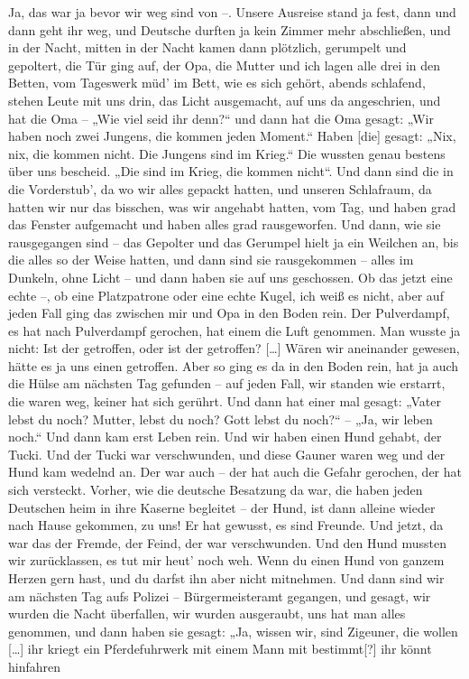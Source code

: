 \documentclass[ngerman,]{article}
\begin{document}
\begin{multicols}{2}
\begin{description}
Ja, das war ja bevor wir weg sind von –. Unsere Ausreise stand ja fest,
dann und dann geht ihr weg, und Deutsche durften ja kein Zimmer mehr
abschließen, und in der Nacht, mitten in der Nacht kamen dann plötzlich,
gerumpelt und gepoltert, die Tür ging auf, der Opa, die Mutter und ich
lagen alle drei in den Betten, vom Tageswerk müd' im Bett, wie es sich
gehört, abends schlafend, stehen Leute mit uns drin, das Licht
ausgemacht, auf uns da angeschrien, und hat die Oma – „Wie viel seid ihr
denn?“ und dann hat die Oma gesagt: „Wir haben noch zwei Jungens, die
kommen jeden Moment.“ Haben {[}die{]} gesagt: „Nix, nix, die kommen
nicht. Die Jungens sind im Krieg.“ Die wussten genau bestens über uns
bescheid. „Die sind im Krieg, die kommen nicht“. Und dann sind die in
die Vorderstub', da wo wir alles gepackt hatten, und unseren Schlafraum,
da hatten wir nur das bisschen, was wir angehabt hatten, vom Tag, und
haben grad das Fenster aufgemacht und haben alles grad rausgeworfen. Und
dann, wie sie rausgegangen sind – das Gepolter und das Gerumpel hielt ja
ein Weilchen an, bis die alles so der Weise hatten, und dann sind sie
rausgekommen – alles im Dunkeln, ohne Licht – und dann haben sie auf uns
geschossen. Ob das jetzt eine echte –, ob eine Platzpatrone oder eine
echte Kugel, ich weiß es nicht, aber auf jeden Fall ging das zwischen
mir und Opa in den Boden rein. Der Pulverdampf, es hat nach Pulverdampf
gerochen, hat einem die Luft genommen. Man wusste ja nicht: Ist der
getroffen, oder ist der getroffen? {[}\ldots{}{]} Wären wir aneinander
gewesen, hätte es ja uns einen getroffen. Aber so ging es da in den
Boden rein, hat ja auch die Hülse am nächsten Tag gefunden – auf jeden
Fall, wir standen wie erstarrt, die waren weg, keiner hat sich gerührt.
Und dann hat einer mal gesagt: „Vater lebst du noch? Mutter, lebst du
noch? Gott lebst du noch?“ – „Ja, wir leben noch.“ Und dann kam erst
Leben rein. Und wir haben einen Hund gehabt, der Tucki. Und der Tucki
war verschwunden, und diese Gauner waren weg und der Hund kam wedelnd
an. Der war auch – der hat auch die Gefahr gerochen, der hat sich
versteckt. Vorher, wie die deutsche Besatzung da war, die haben jeden
Deutschen heim in ihre Kaserne begleitet – der Hund, ist dann alleine
wieder nach Hause gekommen, zu uns! Er hat gewusst, es sind Freunde. Und
jetzt, da war das der Fremde, der Feind, der war verschwunden. Und den
Hund mussten wir zurücklassen, es tut mir heut' noch weh. Wenn du einen
Hund von ganzem Herzen gern hast, und du darfst ihn aber nicht
mitnehmen. Und dann sind wir am nächsten Tag aufs Polizei –
Bürgermeisteramt gegangen, und gesagt, wir wurden die Nacht überfallen,
wir wurden ausgeraubt, uns hat man alles genommen, und dann haben sie
gesagt: „Ja, wissen wir, sind Zigeuner, die wollen {[}\ldots{}{]} ihr
kriegt ein Pferdefuhrwerk mit einem Mann mit bestimmt{[}?{]} ihr könnt
hinfahren
\end{description}


\end{multicols}
\end{document}
